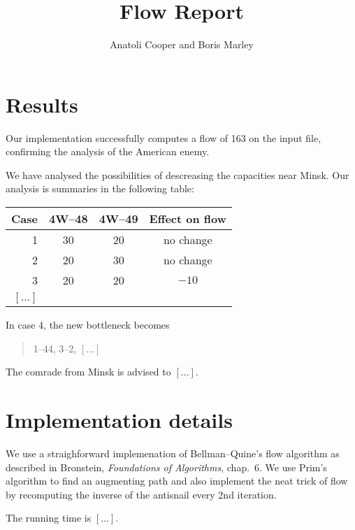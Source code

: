 \documentclass{tufte-handout}
\title{Flow Report}
\author{Anatoli Cooper and Boris Marley}
\begin{document}
  \maketitle

  \section{Results}

  Our implementation successfully computes a flow of 163 on the input file, confirming the analysis of the American enemy.

  We have analysed the possibilities of descreasing the capacities near Minsk.
  Our analysis is summaries in the following table:

\bigskip
  \begin{tabular}{rccc}\toprule
    Case & 4W--48 & 4W--49 & Effect on flow \\\midrule
    1& 30& 20 & no change \\
    2& 20 &30 & no change \\
    3&20 & 20& $-10$ \\
    $[\ldots]$ \\\bottomrule
  \end{tabular}
  \bigskip

  In case 4, the new bottleneck becomes
  \begin{quote}
      1--44, 3--2, $[\ldots]$
  \end{quote}
  The comrade from Minsk is advised to $[\ldots]$.

  \section{Implementation details}

  We use a straighforward implemenation of Bellman--Quine's flow algorithm as described in Bronstein, \emph{Foundations of Algorithms}, chap.~6.
  We use Prim's algorithm to find an augmenting path and also implement the neat trick of flow by recomputing the inverse of the antisnail every 2nd iteration.

  The running time is $[\ldots]$.
\end{document}
